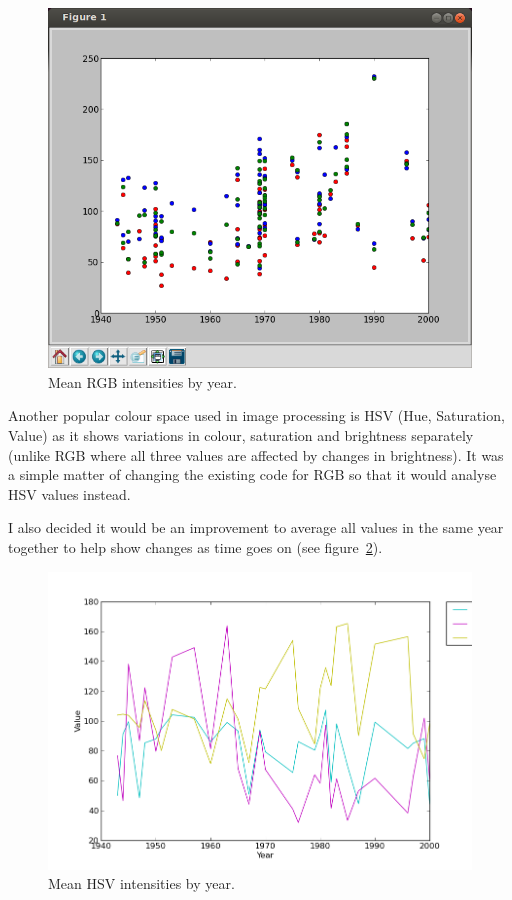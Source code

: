 \documentclass[11pt,fleqn,twoside]{article}
\begin{document}
\begin{figure}[p!]
\includegraphics[scale=0.5]{img/kyffin-rgp-avg.png}
\caption{Mean RGB intensities by year.}
\label{fig:mean-rgb-by-year}
\end{figure}

Another popular colour space used in image processing is HSV (Hue, Saturation, Value) as it shows
variations in colour, saturation and brightness separately (unlike RGB where all three values are
affected by changes in brightness). It was a simple matter of changing the existing code for RGB
so that it would analyse HSV values instead.

I also decided it would be an improvement to average all values in the same year together to help
show changes as time goes on (see figure~\ref{fig:mean-hsv-by-year}).

\begin{figure}[p!]
\includegraphics[scale=0.5]{img/hsv-legend-12-11-01.png}
\caption{Mean HSV intensities by year.}
\label{fig:mean-hsv-by-year}
\end{figure}
\end{document}
